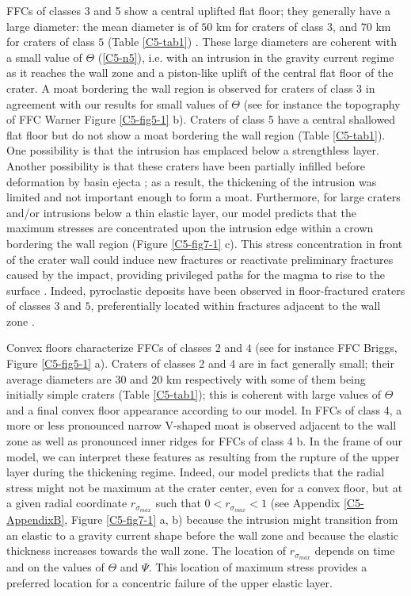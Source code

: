 FFCs  of classes  3 and  5 show  a central  uplifted flat  floor; they
generally have a  large diameter: the mean diameter is  of $50$ km for
craters  of class  3, and  $70$  km for  craters of  class $5$  (Table
\ref{C5-tab1})  \citep{Schultz:1976kt,Jozwiak:2012dq}.    These  large
diameters are coherent  with a small value  of $\Theta$ (\ref{C5-n5}),
i.e.  with  an intrusion in the  gravity current regime as  it reaches
the wall  zone and a piston-like  uplift of the central  flat floor of
the crater.  A moat bordering the  wall region is observed for craters
of class 3 in agreement with  our results for small values of $\Theta$
(see for instance the topography  of FFC Warner Figure \ref{C5-fig5-1}
b).  Craters of class 5 have a central shallowed flat floor but do not
show  a moat  bordering the  wall region  (Table \ref{C5-tab1}).   One
possibility is  that the intrusion  has emplaced below  a strengthless
layer.  Another possibility is that  these craters have been partially
infilled before deformation by basin ejecta \citep{Schultz:1976kt}; as
a  result,  the  thickening  of  the intrusion  was  limited  and  not
important  enough to  form  a moat.   Furthermore,  for large  craters
and/or intrusions below a thin  elastic layer, our model predicts that
the maximum stresses are concentrated upon the intrusion edge within a
crown  bordering the  wall  region (Figure  \ref{C5-fig7-1} c).   This
stress  concentration in  front of  the crater  wall could  induce new
fractures or  reactivate preliminary  fractures caused by  the impact,
providing  privileged paths  for  the  magma to  rise  to the  surface
\citep{Schultz:1976kt}.   Indeed,   pyroclastic  deposits   have  been
observed  in   floor-fractured  craters   of  classes  $3$   and  $5$,
preferentially  located within  fractures  adjacent to  the wall  zone
\citep{Schultz:1976kt}.
	 
Convex  floors characterize  FFCs  of  classes $2$  and  $4$ (see  for
instance FFC Briggs, Figure \ref{C5-fig5-1}  a).  Craters of classes 2
and 4  are in fact generally  small; their average diameters  are $30$
and  $20$ km  respectively  \citep{Jozwiak:2012dq} with  some of  them
being initially simple craters (Table \ref{C5-tab1}); this is coherent
with  large values  of $\Theta$  and a  final convex  floor appearance
according to our model. In FFCs of  class 4, a more or less pronounced
narrow V-shaped moat is observed adjacent  to the wall zone as well as
pronounced inner ridges  for FFCs of class  4 b.  In the  frame of our
model, we can  interpret these features as resulting  from the rupture
of the  upper layer  during the thickening  regime. Indeed,  our model
predicts that  the radial stress  might not  be maximum at  the crater
center, even  for a  convex floor,  but at  a given  radial coordinate
$r_{\sigma_{max}}$  such  that  $0<r_{\sigma_{max}}<1$  (see  Appendix
\ref{C5-AppendixB}, Figure \ref{C5-fig7-1} a, b) because the intrusion
might transition from an elastic to a gravity current shape before the
wall zone and because the elastic thickness increases towards the wall
zone. The  location of $r_{\sigma_{max}}$  depends on time and  on the
values  of  $\Theta$  and  $\Psi$. This  location  of  maximum  stress
provides a  preferred location for  a concentric failure of  the upper
elastic layer.
	 
